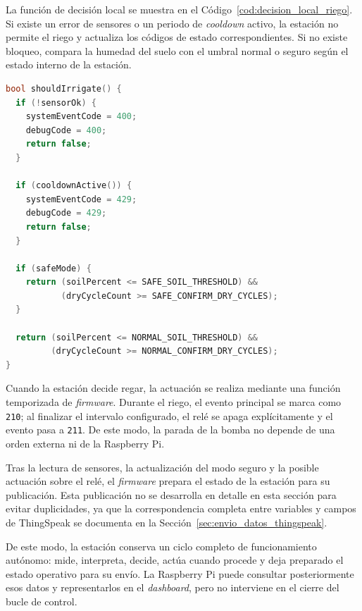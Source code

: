 La función de decisión local se muestra en el Código~\ref{cod:decision_local_riego}. Si existe un error de sensores o un periodo de \textit{cooldown} activo, la estación no permite el riego y actualiza los códigos de estado correspondientes. Si no existe bloqueo, compara la humedad del suelo con el umbral normal o seguro según el estado interno de la estación.

\begin{code}[H]
\begin{lstlisting}[language=C++]
bool shouldIrrigate() {
  if (!sensorOk) {
    systemEventCode = 400;
    debugCode = 400;
    return false;
  }

  if (cooldownActive()) {
    systemEventCode = 429;
    debugCode = 429;
    return false;
  }

  if (safeMode) {
    return (soilPercent <= SAFE_SOIL_THRESHOLD) &&
           (dryCycleCount >= SAFE_CONFIRM_DRY_CYCLES);
  }

  return (soilPercent <= NORMAL_SOIL_THRESHOLD) &&
         (dryCycleCount >= NORMAL_CONFIRM_DRY_CYCLES);
}
\end{lstlisting}
\caption[Decisión local de riego en la estación]{Decisión local de riego en la estación}
\label{cod:decision_local_riego}
\end{code}

Cuando la estación decide regar, la actuación se realiza mediante una función temporizada de \textit{firmware}. Durante el riego, el evento principal se marca como \texttt{210}; al finalizar el intervalo configurado, el relé se apaga explícitamente y el evento pasa a \texttt{211}. De este modo, la parada de la bomba no depende de una orden externa ni de la Raspberry Pi.

Tras la lectura de sensores, la actualización del modo seguro y la posible actuación sobre el relé, el \textit{firmware} prepara el estado de la estación para su publicación. Esta publicación no se desarrolla en detalle en esta sección para evitar duplicidades, ya que la correspondencia completa entre variables y campos de ThingSpeak se documenta en la Sección~\ref{sec:envio_datos_thingspeak}.

De este modo, la estación conserva un ciclo completo de funcionamiento autónomo: mide, interpreta, decide, actúa cuando procede y deja preparado el estado operativo para su envío. La Raspberry Pi puede consultar posteriormente esos datos y representarlos en el \textit{dashboard}, pero no interviene en el cierre del bucle de control.

